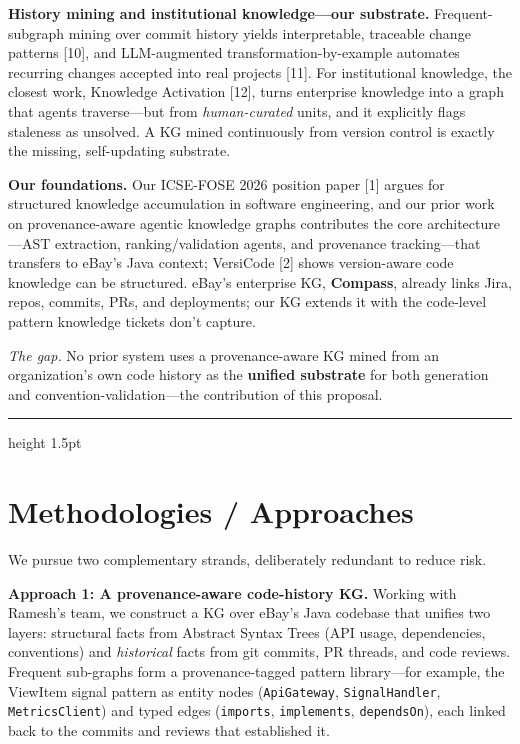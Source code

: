 \documentclass[11pt, letterpaper]{article}
\newcommand{\ehr}{{\color{gray!60}\hrule height 1.5pt}}
\begin{document}
\textbf{History mining and institutional knowledge---our substrate.} Frequent-subgraph mining over commit history yields interpretable, traceable change patterns [10], and LLM-augmented transformation-by-example automates recurring changes accepted into real projects [11]. For institutional knowledge, the closest work, Knowledge Activation [12], turns enterprise knowledge into a graph that agents traverse---but from \emph{human-curated} units, and it explicitly flags staleness as unsolved. A KG mined continuously from version control is exactly the missing, self-updating substrate.


\textbf{Our foundations.} Our ICSE-FOSE 2026 position paper [1] argues for structured knowledge accumulation in software engineering, and our prior work on provenance-aware agentic knowledge graphs contributes the core architecture---AST extraction, ranking/validation agents, and provenance tracking---that transfers to eBay's Java context; VersiCode [2] shows version-aware code knowledge can be structured. eBay's enterprise KG, \textbf{Compass}, already links Jira, repos, commits, PRs, and deployments; our KG extends it with the code-level pattern knowledge tickets don't capture.

\emph{The gap.} No prior system uses a provenance-aware KG mined from an organization's own code history as the \textbf{unified substrate} for both generation and convention-validation---the contribution of this proposal.

\ehr

\section*{Methodologies / Approaches}
\label{sec:method}

We pursue two complementary strands, deliberately redundant to reduce risk.

\textbf{Approach 1: A provenance-aware code-history KG.} Working with Ramesh's team, we construct a KG over eBay's Java codebase that unifies two layers: structural facts from Abstract Syntax Trees (API usage, dependencies, conventions) and \emph{historical} facts from git commits, PR threads, and code reviews. Frequent sub-graphs form a provenance-tagged pattern library---for example, the ViewItem signal pattern as entity nodes (\texttt{ApiGateway}, \texttt{SignalHandler}, \texttt{MetricsClient}) and typed edges (\texttt{imports}, \texttt{implements}, \texttt{dependsOn}), each linked back to the commits and reviews that established it.
\end{document}

